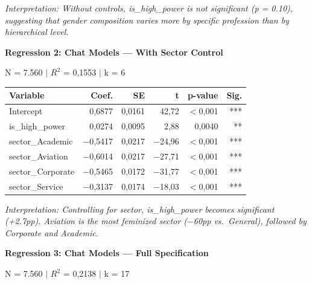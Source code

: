 \documentclass[jair,11pt,letterpaper]{article}
\begin{document}
\noindent\textit{Interpretation: Without controls, is\_high\_power is not significant (p =
0.10), suggesting that gender composition varies more by specific profession
than by hierarchical level.}

\vspace{0.5cm}
\noindent\textbf{Regression 2: Chat Models --- With Sector Control}

\noindent N = 7.560 $|$ $R^2$ = 0,1553 $|$ k = 6

\begin{table}[H]
\centering
\begin{tabular}{lrrrrr}
\toprule
\textbf{Variable} & \textbf{Coef.} & \textbf{SE} & \textbf{t} & \textbf{p-value} & \textbf{Sig.} \\
\midrule
Intercept & 0,6877 & 0,0161 & 42,72 & $<$0,001 & *** \\
is\_high\_power & 0,0274 & 0,0095 & 2,88 & 0,0040 & ** \\
sector\_Academic & $-$0,5417 & 0,0217 & $-$24,96 & $<$0,001 & *** \\
sector\_Aviation & $-$0,6014 & 0,0217 & $-$27,71 & $<$0,001 & *** \\
sector\_Corporate & $-$0,5465 & 0,0172 & $-$31,77 & $<$0,001 & *** \\
sector\_Service & $-$0,3137 & 0,0174 & $-$18,03 & $<$0,001 & *** \\
\bottomrule
\end{tabular}
\end{table}

\noindent\textit{Interpretation: Controlling for sector, is\_high\_power becomes
significant (+2.7pp). Aviation is the most feminized sector ($-$60pp vs.\
General), followed by Corporate and Academic.}

\vspace{0.5cm}
\noindent\textbf{Regression 3: Chat Models --- Full Specification}

\noindent N = 7.560 $|$ $R^2$ = 0,2138 $|$ k = 17
\end{document}
